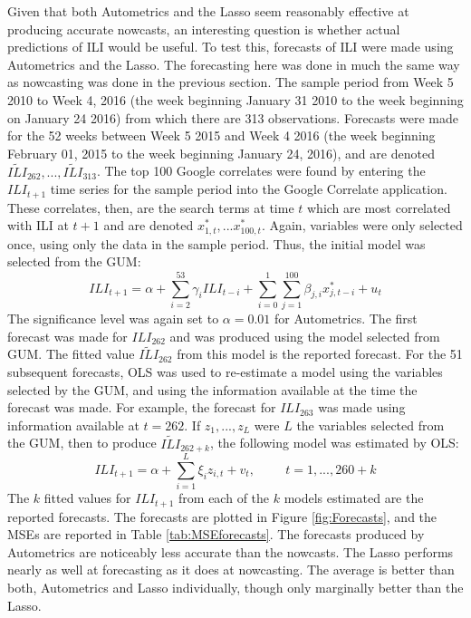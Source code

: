 Given that both Autometrics and the Lasso seem reasonably effective at producing accurate nowcasts, an interesting question is whether actual predictions of ILI would be useful. To test this, forecasts of ILI were made using Autometrics and the Lasso.
The forecasting here was done in much the same way as nowcasting was done in the previous section. The sample period from Week 5 2010 to Week 4, 2016 (the week beginning January 31 2010 to the week beginning on January 24 2016) from which there are 313 observations. Forecasts were made for the 52 weeks between Week 5 2015 and Week 4 2016 (the week beginning February 01, 2015 to the week beginning January 24, 2016), and are denoted $\widetilde{ILI}_{262},...,\widetilde{ILI}_{313}$. The top 100 Google correlates were found by entering the $ILI_{t+1}$ time series for the sample period into the Google Correlate application. These correlates, then, are the search terms at time $t$ which are most correlated with ILI at $t+1$ and are denoted $x_{1,t}^{*},...x_{100,t}^{*}$. Again, variables were only selected once, using only the data in the sample period. Thus, the initial model was selected from the GUM:
$$ILI_{t+1}= \alpha + \sum_{i=2}^{53}\gamma_{i}ILI_{t-i}+ \sum_{i=0}^{1}\sum_{j=1}^{100}\beta_{j,i}x_{j,t-i}^{*}+u_{t}$$
The significance level was again set to $\alpha = 0.01$ for Autometrics. The first forecast was made for $ILI_{262}$ and was produced using the model selected from GUM. The fitted value $\widetilde{ILI}_{262}$ from this model is the reported forecast.  For the 51 subsequent forecasts, OLS was used to re-estimate a model using the variables selected by the GUM, and using the information available at the time the forecast was made. For example, the forecast for $ILI_{263}$ was made using information available at $t=262$. If $z_{1},...,z_{L}$ were $L$ the variables selected from the GUM, then to produce $\widetilde{ILI}_{262+k}$, the following model was estimated by OLS:
$$ILI_{t+1}= \alpha + \sum_{i=1}^{L}\xi_{i}z_{i,t}+ v_{t}, \hspace{1cm}  t=1,...,260+k$$
The $k$ fitted values for $ILI_{t+1}$ from each of the $k$ models estimated are the reported forecasts. The forecasts are plotted in Figure \ref{fig:Forecasts}, and the MSEs are reported in Table \ref{tab:MSEforecasts}. The forecasts produced by Autometrics are noticeably less accurate than the nowcasts. The Lasso performs nearly as well at forecasting as it does at nowcasting. The average is better than both, Autometrics and Lasso individually, though only marginally better than the Lasso. 



